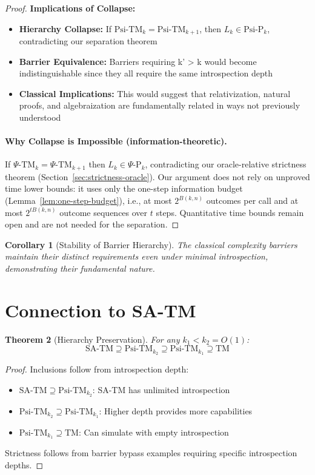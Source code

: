 \documentclass[11pt]{article}
\newtheorem{theorem}{Theorem}[section]
\newtheorem{corollary}[theorem]{Corollary}
\theoremstyle{definition}
\begin{document}
\begin{proof}
\textbf{Implications of Collapse:}
\begin{itemize}
\item \textbf{Hierarchy Collapse:} If $\text{Psi-TM}_k = \text{Psi-TM}_{k+1}$, then $L_k \in \text{Psi-P}_k$, contradicting our separation theorem
\item \textbf{Barrier Equivalence:} Barriers requiring k' > k would become indistinguishable since they all require the same introspection depth
\item \textbf{Classical Implications:} This would suggest that relativization, natural proofs, and algebraization are fundamentally related in ways not previously understood
\end{itemize}

\paragraph{Why Collapse is Impossible (information-theoretic).}
If $\Psi\text{-TM}_k=\Psi\text{-TM}_{k+1}$ then $L_k\in\Psi\text{-P}_k$, contradicting our
oracle-relative strictness theorem (Section~\ref{sec:strictness-oracle}). Our argument
does not rely on unproved time lower bounds: it uses only the one-step information
budget (Lemma~\ref{lem:one-step-budget}), i.e., at most $2^{B(k,n)}$ outcomes per call
and at most $2^{t B(k,n)}$ outcome sequences over $t$ steps. Quantitative time bounds
remain open and are not needed for the separation.
\end{proof}

\begin{corollary}[Stability of Barrier Hierarchy]
The classical complexity barriers maintain their distinct requirements even under minimal introspection, demonstrating their fundamental nature.
\end{corollary}

\section{Connection to SA-TM}

\begin{theorem}[Hierarchy Preservation]
For any $k_1 < k_2 = O(1)$:
$$\text{SA-TM} \supseteq \text{Psi-TM}_{k_2} \supseteq \text{Psi-TM}_{k_1} \supseteq \text{TM}$$
\end{theorem}

\begin{proof}
Inclusions follow from introspection depth:
\begin{itemize}
\item $\text{SA-TM} \supseteq \text{Psi-TM}_{k_2}$: SA-TM has unlimited introspection
\item $\text{Psi-TM}_{k_2} \supseteq \text{Psi-TM}_{k_1}$: Higher depth provides more capabilities  
\item $\text{Psi-TM}_{k_1} \supseteq \text{TM}$: Can simulate with empty introspection
\end{itemize}
Strictness follows from barrier bypass examples requiring specific introspection depths.
\end{proof}
\end{document}

